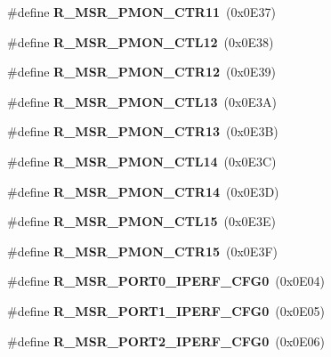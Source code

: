 \begin{DoxyCompactItemize}
\item 
\#define {\bfseries R\+\_\+\+M\+S\+R\+\_\+\+P\+M\+O\+N\+\_\+\+C\+T\+R11}~(0x0\+E37)\label{types_8h_a6f5078153d1b8263e1c93e3756936b18}

\item 
\#define {\bfseries R\+\_\+\+M\+S\+R\+\_\+\+P\+M\+O\+N\+\_\+\+C\+T\+L12}~(0x0\+E38)\label{types_8h_afa94f7dbc5b2e29b5089f52e90704ea8}

\item 
\#define {\bfseries R\+\_\+\+M\+S\+R\+\_\+\+P\+M\+O\+N\+\_\+\+C\+T\+R12}~(0x0\+E39)\label{types_8h_ad779cc22091d86fa05eaa8a5c08f82e8}

\item 
\#define {\bfseries R\+\_\+\+M\+S\+R\+\_\+\+P\+M\+O\+N\+\_\+\+C\+T\+L13}~(0x0\+E3\+A)\label{types_8h_a6b4483152a082378b4eab2a2ca13f92a}

\item 
\#define {\bfseries R\+\_\+\+M\+S\+R\+\_\+\+P\+M\+O\+N\+\_\+\+C\+T\+R13}~(0x0\+E3\+B)\label{types_8h_aab7a03250792a657718626c581233389}

\item 
\#define {\bfseries R\+\_\+\+M\+S\+R\+\_\+\+P\+M\+O\+N\+\_\+\+C\+T\+L14}~(0x0\+E3\+C)\label{types_8h_af763232e0cf73ab683dea895c4c08d46}

\item 
\#define {\bfseries R\+\_\+\+M\+S\+R\+\_\+\+P\+M\+O\+N\+\_\+\+C\+T\+R14}~(0x0\+E3\+D)\label{types_8h_adb00e6f65301c9fb8e27d352bdc2f86b}

\item 
\#define {\bfseries R\+\_\+\+M\+S\+R\+\_\+\+P\+M\+O\+N\+\_\+\+C\+T\+L15}~(0x0\+E3\+E)\label{types_8h_a2a446dd93e56fe597c4c45ddea703146}

\item 
\#define {\bfseries R\+\_\+\+M\+S\+R\+\_\+\+P\+M\+O\+N\+\_\+\+C\+T\+R15}~(0x0\+E3\+F)\label{types_8h_a64f833080da0bdc3be605b901cb71a19}

\item 
\#define {\bfseries R\+\_\+\+M\+S\+R\+\_\+\+P\+O\+R\+T0\+\_\+\+I\+P\+E\+R\+F\+\_\+\+C\+F\+G0}~(0x0\+E04)\label{types_8h_a4f4380ac1df3e08b742587229155efef}

\item 
\#define {\bfseries R\+\_\+\+M\+S\+R\+\_\+\+P\+O\+R\+T1\+\_\+\+I\+P\+E\+R\+F\+\_\+\+C\+F\+G0}~(0x0\+E05)\label{types_8h_a7ee270e4c83cf7c06e7839cefe26375a}

\item 
\#define {\bfseries R\+\_\+\+M\+S\+R\+\_\+\+P\+O\+R\+T2\+\_\+\+I\+P\+E\+R\+F\+\_\+\+C\+F\+G0}~(0x0\+E06)\label{types_8h_abe4e540734062b1f4863f6148d84a04c}


\end{DoxyCompactItemize}
